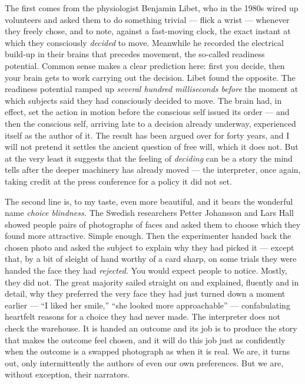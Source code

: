 The first comes from the physiologist Benjamin Libet, who in the 1980s wired up volunteers and asked them to do something trivial — flick a wrist — whenever they freely chose, and to note, against a fast-moving clock, the exact instant at which they consciously \emph{decided} to move. Meanwhile he recorded the electrical build-up in their brains that precedes movement, the so-called readiness potential. Common sense makes a clear prediction here: first you decide, then your brain gets to work carrying out the decision. Libet found the opposite. The readiness potential ramped up \emph{several hundred milliseconds before} the moment at which subjects said they had consciously decided to move. The brain had, in effect, set the action in motion before the conscious self issued its order — and then the conscious self, arriving late to a decision already underway, experienced itself as the author of it. The result has been argued over for forty years, and I will not pretend it settles the ancient question of free will, which it does not. But at the very least it suggests that the feeling of \emph{deciding} can be a story the mind tells after the deeper machinery has already moved — the interpreter, once again, taking credit at the press conference for a policy it did not set.

The second line is, to my taste, even more beautiful, and it bears the wonderful name \emph{choice blindness.} The Swedish researchers Petter Johansson and Lars Hall showed people pairs of photographs of faces and asked them to choose which they found more attractive. Simple enough. Then the experimenter handed back the chosen photo and asked the subject to explain why they had picked it — except that, by a bit of sleight of hand worthy of a card sharp, on some trials they were handed the face they had \emph{rejected.} You would expect people to notice. Mostly, they did not. The great majority sailed straight on and explained, fluently and in detail, why they preferred the very face they had just turned down a moment earlier — ``I liked her smile,'' ``she looked more approachable'' — confabulating heartfelt reasons for a choice they had never made. The interpreter does not check the warehouse. It is handed an outcome and its job is to produce the story that makes the outcome feel chosen, and it will do this job just as confidently when the outcome is a swapped photograph as when it is real. We are, it turns out, only intermittently the authors of even our own preferences. But we are, without exception, their narrators.

